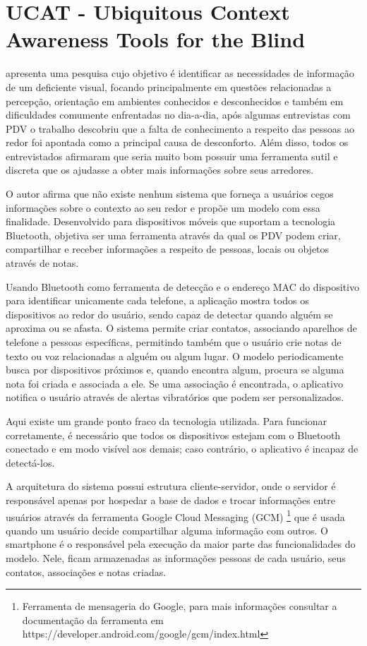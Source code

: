 \documentclass[english,brazilian]{UNISINOSmonografia}
\begin{document}
	\section{UCAT - Ubiquitous Context Awareness Tools for the Blind}
 apresenta uma pesquisa cujo objetivo é identificar as necessidades de informação de um deficiente visual, focando principalmente em questões relacionadas a percepção, orientação em ambientes conhecidos e desconhecidos e também em dificuldades comumente enfrentadas no dia-a-dia, após algumas entrevistas com PDV o trabalho descobriu que a falta de conhecimento a respeito das pessoas ao redor foi apontada como a principal causa de desconforto. Além disso, todos os entrevistados afirmaram que seria muito bom possuir uma ferramenta sutil e discreta que os ajudasse a obter mais informações sobre seus arredores.

O autor afirma que não existe nenhum sistema que forneça a usuários cegos informações sobre o contexto ao seu redor e propõe um modelo com essa finalidade. Desenvolvido para dispositivos móveis que suportam a tecnologia Bluetooth, objetiva ser uma ferramenta através da qual os PDV podem criar, compartilhar e receber informações a respeito de pessoas, locais ou objetos através de notas. 

Usando Bluetooth como ferramenta de detecção e o endereço MAC do dispositivo para identificar unicamente cada telefone, a aplicação mostra todos os dispositivos ao redor do usuário, sendo capaz de detectar quando alguém se aproxima ou se afasta. O sistema permite criar contatos, associando aparelhos de telefone a pessoas específicas, permitindo também que o usuário crie notas de texto ou voz relacionadas a alguém ou algum lugar. O modelo periodicamente busca por dispositivos próximos e, quando encontra algum, procura se alguma nota foi criada e associada a ele. Se uma associação é encontrada, o aplicativo notifica o usuário através de alertas vibratórios que podem ser personalizados.

Aqui existe um grande ponto fraco da tecnologia utilizada. Para funcionar corretamente, é necessário que todos os dispositivos estejam com o Bluetooth conectado e em modo visível aos demais; caso contrário, o aplicativo é incapaz de detectá-los.

A arquitetura do sistema possui estrutura cliente-servidor, onde o servidor é responsável apenas por hospedar a base de dados e trocar informações entre usuários através da ferramenta Google Cloud Messaging (GCM) \footnote{Ferramenta de mensageria do Google, para mais informações consultar a documentação da ferramenta em https://developer.android.com/google/gcm/index.html} que é usada quando um usuário decide compartilhar alguma informação com outros. O smartphone é o responsável pela execução da maior parte das funcionalidades do modelo. Nele, ficam armazenadas as informações pessoas de cada usuário, seus contatos, associações e notas criadas.
\end{document}
